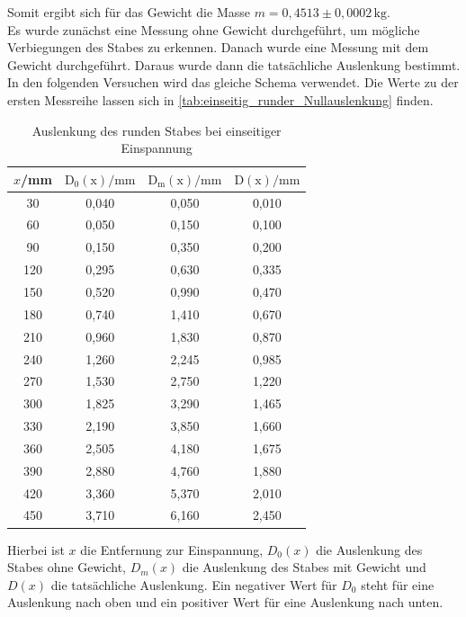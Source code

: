   Somit ergibt sich für das Gewicht die Masse $m = 0{,}4513 \pm 0,0002 \, \mathrm{kg}$.\\

  Es wurde zunächst eine Messung ohne Gewicht durchgeführt, um mögliche Verbiegungen des Stabes zu erkennen. Danach wurde eine Messung mit
  dem Gewicht durchgeführt. Daraus wurde dann die tatsächliche Auslenkung bestimmt. In den folgenden Versuchen wird das gleiche Schema verwendet. Die Werte zu der ersten
  Messreihe lassen sich in \autoref{tab:einseitig_runder_Nullauslenkung} finden.

  \begin{table}
    \centering
    \caption{Auslenkung des runden Stabes bei einseitiger Einspannung}
    \label{tab:einseitig_runder_Nullauslenkung}
    \begin{tabular}{c c c c}
      \toprule
      $x$/mm & $\mathrm{D_0(x)}/\mathrm{mm}$ & $\mathrm{D_m(x)}/\mathrm{mm}$ & $\mathrm{D(x)}/\mathrm{mm}$ \\
      \midrule
      30 & 0,040 & 0,050 & 0,010 \\
      60 & 0,050 & 0,150 & 0,100 \\
      90 & 0,150 & 0,350 & 0,200 \\
      120 & 0,295 & 0,630 & 0,335 \\
      150 & 0,520 & 0,990 & 0,470 \\
      180 & 0,740 & 1,410 & 0,670 \\
      210 & 0,960 & 1,830 & 0,870 \\
      240 & 1,260 & 2,245 & 0,985 \\
      270 & 1,530 & 2,750 & 1,220 \\
      300 & 1,825 & 3,290 & 1,465 \\
      330 & 2,190 & 3,850 & 1,660 \\
      360 & 2,505 & 4,180 & 1,675 \\
      390 & 2,880 & 4,760 & 1,880 \\
      420 & 3,360 & 5,370 & 2,010 \\
      450 & 3,710 & 6,160 & 2,450 \\
      \bottomrule
    \end{tabular}
  \end{table}

  Hierbei ist $x$ die Entfernung zur Einspannung, $D_0(x)$ die Auslenkung des Stabes ohne Gewicht, $D_m(x)$ die Auslenkung des Stabes mit Gewicht und
  $D(x)$ die tatsächliche Auslenkung. Ein negativer Wert für $D_0$ steht für eine Auslenkung nach oben und ein positiver Wert für eine Auslenkung nach unten.\\

